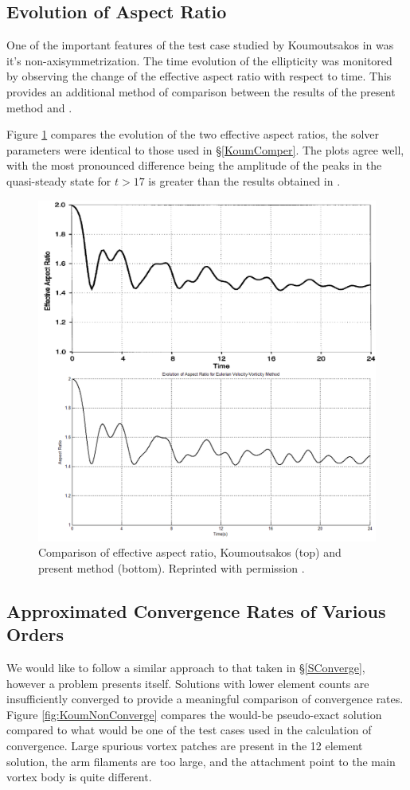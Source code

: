 \documentclass[letterpaper,12pt]{report}
\begin{document}
%
\subsection{Evolution of Aspect Ratio}
One of the important features of the test case studied by Koumoutsakos in \cite{Koum1997} was it's non-axisymmetrization. The time evolution of the ellipticity was monitored by observing the change of the effective aspect ratio with respect to time. This provides an additional method of comparison between the results of the present method and  \cite{Koum1997}.

Figure \ref{fig:AspectRatio} compares the evolution of the two effective aspect ratios, the solver parameters were identical to those used in \S\ref{KoumComper}. The plots agree well, with the most pronounced difference being the amplitude of the peaks in the quasi-steady state for $t>17$ is greater than the results obtained in \cite{Koum1997}.
\begin{figure}
\centering
\includegraphics[width=1\textwidth]{AspectRatio.PNG}
\caption{\label{fig:AspectRatio}Comparison of effective aspect ratio, Koumoutsakos \cite{Koum1997} (top) and present method (bottom). Reprinted with permission \cite{KoumLic}.}
\end{figure}
%
\subsection{Approximated Convergence Rates of Various Orders}
We would like to follow a similar approach to that taken in \S\ref{SConverge}, however a problem presents itself. Solutions with lower element counts are insufficiently converged to provide a meaningful comparison of convergence rates. Figure \ref{fig:KoumNonConverge} compares the would-be pseudo-exact solution compared to what would be one of the test cases used in the calculation of convergence. Large spurious vortex patches are present in the 12 element solution, the arm filaments are too large, and the attachment point to the main vortex body is quite different.
\end{document}
